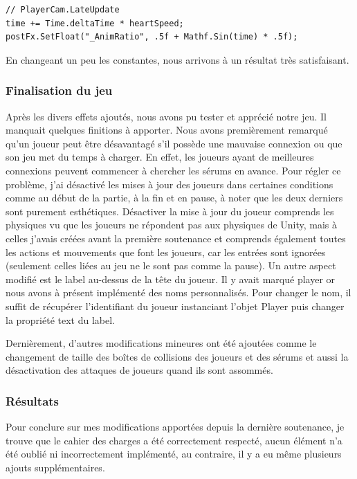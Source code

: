 \documentclass{article}
\begin{document}
\begin{lstlisting}
// PlayerCam.LateUpdate
time += Time.deltaTime * heartSpeed;
postFx.SetFloat("_AnimRatio", .5f + Mathf.Sin(time) * .5f);
\end{lstlisting}


En changeant un peu les constantes, nous arrivons à un résultat très satisfaisant.


\subsubsection{Finalisation du jeu}


Après les divers effets ajoutés, nous avons pu tester et apprécié notre jeu. Il manquait quelques finitions à apporter.
Nous avons premièrement remarqué qu'un joueur peut être désavantagé s'il possède une mauvaise connexion ou que son jeu met du temps à charger. En effet, les joueurs ayant de meilleures connexions peuvent commencer à chercher les sérums en avance. Pour régler ce problème, j'ai désactivé les mises à jour des joueurs dans certaines conditions comme au début de la partie, à la fin et en pause, à noter que les deux derniers sont purement esthétiques. Désactiver la mise à jour du joueur comprends les physiques vu que les joueurs ne répondent pas aux physiques de Unity, mais à celles j'avais créées avant la première soutenance et comprends également toutes les actions et mouvements que font les joueurs, car les entrées sont ignorées (seulement celles liées au jeu ne le sont pas comme la pause).
Un autre aspect modifié est le label au-dessus de la tête du joueur. Il y avait marqué player or nous avons à présent implémenté des noms personnalisés. Pour changer le nom, il suffit de récupérer l'identifiant du joueur instanciant l'objet Player puis changer la propriété text du label.


Dernièrement, d'autres modifications mineures ont été ajoutées comme le changement de taille des boîtes de collisions des joueurs et des sérums et aussi la désactivation des attaques de joueurs quand ils sont assommés.


\subsubsection{Résultats}


Pour conclure sur mes modifications apportées depuis la dernière soutenance, je trouve que le cahier des charges a été correctement respecté, aucun élément n'a été oublié ni incorrectement implémenté, au contraire, il y a eu même plusieurs ajouts supplémentaires.
\end{document}
